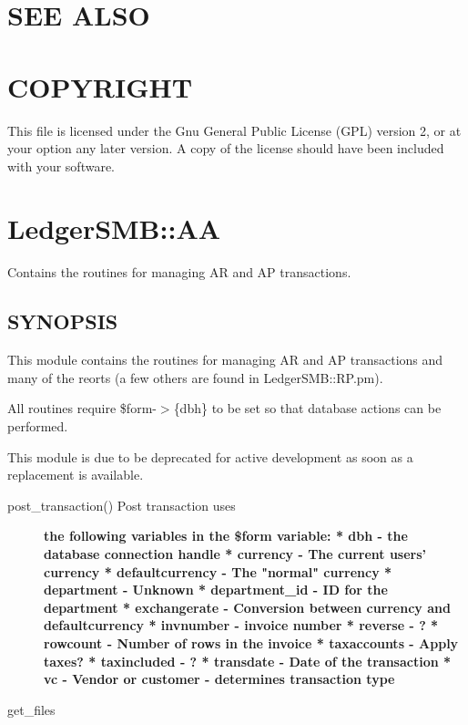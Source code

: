 \begin{description}
\begin{description}
\begin{description}
\begin{description}
\begin{description}
\begin{description}
\begin{description}
\begin{description}
\end{description}
\section{SEE ALSO\label{SEE_ALSO}}
\section{COPYRIGHT\label{COPYRIGHT}}


This file is licensed under the Gnu General Public License (GPL) version 2, or 
at your option any later version.  A copy of the license should have been 
included with your software.

\section{LedgerSMB::AA\label{LedgerSMB::AA}}


Contains the routines for managing AR and AP transactions.

\subsection*{SYNOPSIS\label{LedgerSMB::AA_SYNOPSIS}}


This module contains the routines for managing AR and AP transactions and 
many of the reorts (a few others are found in LedgerSMB::RP.pm).



All routines require \$form-$>$\{dbh\} to be set so that database actions can
be performed.



This module is due to be deprecated for active development as soon as a 
replacement is available.

\begin{description}

\item[{post\_transaction() Post transaction uses}] \textbf{the following variables in the \$form variable: * dbh - the database connection handle * currency - The current users' currency * defaultcurrency - The "normal" currency * department - Unknown * department\_id - ID for the department * exchangerate - Conversion between currency and defaultcurrency * invnumber - invoice number * reverse - ? * rowcount - Number of rows in the invoice * taxaccounts - Apply taxes? * taxincluded - ? * transdate - Date of the transaction * vc - Vendor or customer - determines transaction type}
\item[{get\_files}] \mbox{}


\end{description}
\end{description}
\end{description}
\end{description}
\end{description}
\end{description}
\end{description}
\end{description}
